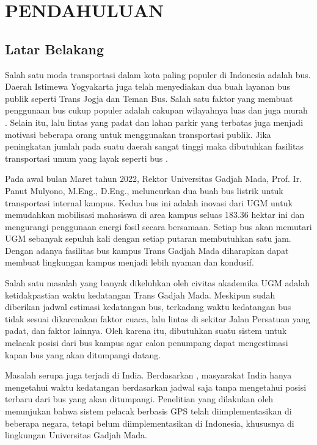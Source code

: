 \chapter{PENDAHULUAN}

\section{Latar Belakang}
Salah satu moda transportasi dalam kota paling populer di Indonesia adalah bus. Daerah Istimewa Yogyakarta juga telah menyediakan dua buah layanan bus publik seperti Trans Jogja dan Teman Bus. Salah satu faktor yang membuat penggunaan bus cukup populer adalah cakupan wilayahnya luas dan juga murah \cite{Rohani2013}. Selain itu, lalu lintas yang padat dan lahan parkir yang terbatas juga menjadi motivasi beberapa orang untuk menggunakan transportasi publik. Jika peningkatan jumlah pada suatu daerah sangat tinggi maka dibutuhkan fasilitas transportasi umum yang layak seperti bus \cite{Sutandi2015}.

Pada awal bulan Maret tahun 2022, Rektor Universitas Gadjah Mada, Prof. Ir. Panut Mulyono, M.Eng., D.Eng., meluncurkan dua buah bus listrik untuk transportasi internal kampus. Kedua bus ini adalah inovasi dari UGM untuk memudahkan mobilisasi mahasiswa di area kampus seluas 183.36 hektar ini dan mengurangi penggunaan energi fosil secara bersamaan. Setiap bus akan memutari UGM sebanyak sepuluh kali dengan setiap putaran membutuhkan satu jam. Dengan adanya fasilitas bus kampus Trans Gadjah Mada diharapkan dapat membuat lingkungan kampus menjadi lebih nyaman dan kondusif.

Salah satu masalah yang banyak dikeluhkan oleh civitas akademika UGM adalah ketidakpastian waktu kedatangan Trans Gadjah Mada. Meskipun sudah diberikan jadwal estimasi kedatangan bus, terkadang waktu kedatangan bus tidak sesuai dikarenakan faktor cuaca, lalu lintas di sekitar Jalan Persatuan yang padat, dan faktor lainnya. Oleh karena itu, dibutuhkan suatu sistem untuk melacak posisi dari bus kampus agar calon penumpang dapat mengestimasi kapan bus yang akan ditumpangi datang.

Masalah serupa juga terjadi di India. Berdasarkan  \cite{Sutar2016}, masyarakat India hanya mengetahui waktu kedatangan berdasarkan jadwal saja tanpa mengetahui posisi terbaru dari bus yang akan ditumpangi. Penelitian yang dilakukan oleh \cite{Sneha2014} menunjukan bahwa sistem pelacak berbasis GPS telah diimplementasikan di beberapa negara, tetapi belum diimplementasikan di Indonesia, khususnya di lingkungan Universitas Gadjah Mada.

